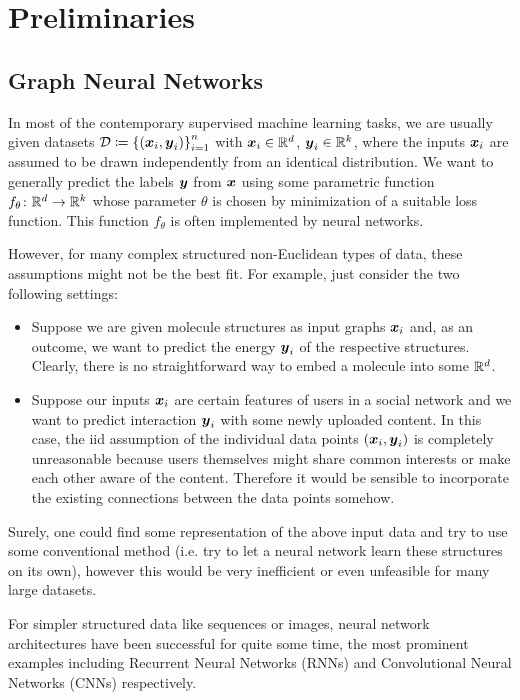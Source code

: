\section{Preliminaries}
\label{section:preleminaries}

\subsection{Graph Neural Networks}

In most of the contemporary supervised machine learning tasks, we are usually given 
datasets
$\mathcal{D} \coloneqq \left\{(\boldsymbol{x}_i, \boldsymbol{y}_i)\right\}_{i=1}^n$ with $\boldsymbol{x}_i \in \mathbb{R}^{d}$, $\boldsymbol{y}_i \in \mathbb{R}^k$,
where the inputs $\boldsymbol{x}_i$ are assumed to be drawn independently from an identical 
distribution. We want to generally predict the labels $\boldsymbol{y}$ from $\boldsymbol{x}$ using
some parametric function $f_\theta \colon \mathbb{R}^d \to \mathbb{R}^k$ whose parameter $\theta$ is chosen
by minimization of a suitable loss function. This function $f_{\theta}$ is often implemented 
by neural networks.

However, for many complex structured non-Euclidean types of data, these assumptions might 
not be the best fit. For example, just consider the two following settings:
\begin{itemize}
    \item Suppose we are given molecule structures as input graphs $\boldsymbol{x}_i$ and, as an 
          outcome, we want to predict the energy $\boldsymbol{y}_i$ of the respective structures. 
          Clearly, there is no straightforward way to embed a molecule into some $\mathbb{R}^d$.
    \item Suppose our inputs $\boldsymbol{x}_i$ are certain features of users in a social network
          and we want to predict interaction $\boldsymbol{y}_i$ with some newly uploaded content. In this 
          case, the iid assumption of the individual data points $(\boldsymbol{x}_i, \boldsymbol{y}_i)$ is 
          completely unreasonable because users themselves might share common interests 
          or make each other aware of the content. Therefore it would be sensible to incorporate the 
          existing connections between the data points somehow.
\end{itemize}
Surely, one could find some representation of the above input data and try to use some
conventional method (i.e. try to let a neural network learn these structures on its own),
however this would be very inefficient or even unfeasible for many large datasets. 

For simpler structured data like sequences or images, neural
network architectures have been successful for quite some time, the 
most prominent examples including Recurrent Neural Networks (RNNs) and
Convolutional Neural Networks (CNNs) respectively. 

